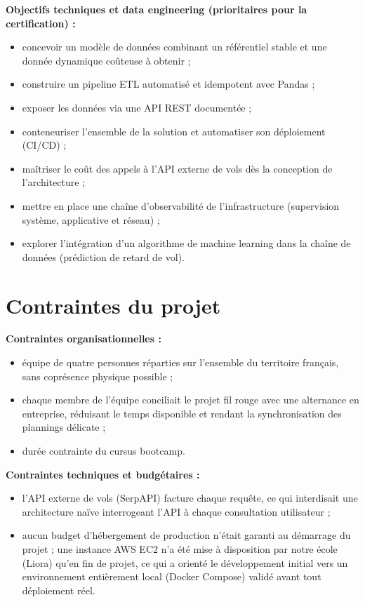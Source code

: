 \documentclass[11pt,a4paper]{report}
\begin{document}
\textbf{Objectifs techniques et data engineering (prioritaires pour la certification) :}
\begin{itemize}
  \item concevoir un modèle de données combinant un référentiel stable et une donnée dynamique coûteuse à obtenir ;
  \item construire un pipeline ETL automatisé et idempotent avec Pandas ;
  \item exposer les données via une API REST documentée ;
  \item conteneuriser l'ensemble de la solution et automatiser son déploiement (CI/CD) ;
  \item maîtriser le coût des appels à l'API externe de vols dès la conception de l'architecture ;
  \item mettre en place une chaîne d'observabilité de l'infrastructure (supervision système, applicative et réseau) ;
  \item explorer l'intégration d'un algorithme de machine learning dans la chaîne de données (prédiction de retard de vol).
\end{itemize}

\section{Contraintes du projet}

\textbf{Contraintes organisationnelles :}
\begin{itemize}
  \item équipe de quatre personnes réparties sur l'ensemble du territoire français, sans coprésence physique possible ;
  \item chaque membre de l'équipe conciliait le projet fil rouge avec une alternance en entreprise, réduisant le temps disponible et rendant la synchronisation des plannings délicate ;
  \item durée contrainte du cursus bootcamp.
\end{itemize}

\textbf{Contraintes techniques et budgétaires :}
\begin{itemize}
  \item l'API externe de vols (SerpAPI) facture chaque requête, ce qui interdisait une architecture naïve interrogeant l'API à chaque consultation utilisateur ;
  \item aucun budget d'hébergement de production n'était garanti au démarrage du projet ; une instance AWS EC2 n'a été mise à disposition par notre école (Liora) qu'en fin de projet, ce qui a orienté le développement initial vers un environnement entièrement local (Docker Compose) validé avant tout déploiement réel.
\end{itemize}
\end{document}
